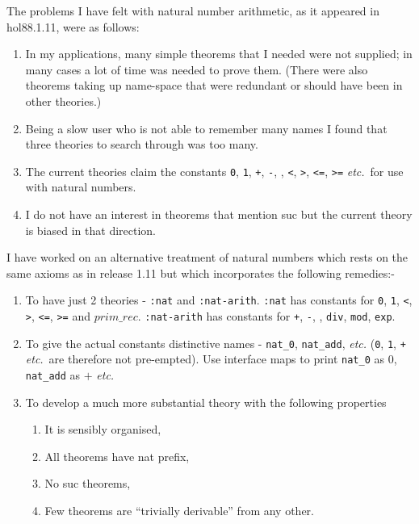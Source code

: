 The problems I have felt with natural number arithmetic, as it appeared
in {\sc hol88.1.11}, were as follows:
\begin{enumerate}
\item In my applications, many simple theorems that I needed were not supplied;
   in many cases a lot of time was needed to prove them.
   (There were also theorems taking up name-space that were redundant or
   should have been in other theories.)
\item Being a slow user who is not able to remember many names I found that
   three theories to search through was too many.
\item The current theories claim the constants
  {\tt 0}, {\tt 1}, {\tt +}, {\tt -}, {\tt *}, {\tt <}, {\tt >},
  {\tt <=}, {\tt >=} {\it etc.}~for use with natural numbers.
\item I do not have an interest in theorems that mention {\sc suc} but
   the current theory is biased in that direction.
\end{enumerate}

I have worked on an alternative treatment of natural numbers which rests
on the same axioms as in release 1.11 but which incorporates the following
remedies:-
\begin{enumerate}
\item To have just 2 theories -  {\tt :nat} and  {\tt :nat-arith}.
   {\tt :nat}  has constants for {\tt 0}, {\tt 1}, {\tt <}, {\tt >},
  {\tt <=}, {\tt >=} and $ prim\_rec $.
   {\tt :nat-arith}  has constants for {\tt +}, {\tt -}, {\tt *},
   {\tt div}, {\tt mod}, {\tt exp}.
\item To give the actual constants distinctive names - {\tt nat\_0},
 {\tt nat\_add}, {\it etc.}  ({\tt 0}, {\tt 1}, {\tt +} {\it etc.}~are
 therefore not pre-empted).
   Use interface maps to print {\tt nat\_0} as $0$, {\tt nat\_add} as
   $+$ {\it etc.}
\item To develop a much more substantial theory with the following properties
\begin{enumerate}
\item It is sensibly organised,
\item All theorems have {\sc nat} prefix,
\item No {\sc suc} theorems,
\item  Few theorems are ``trivially derivable'' from any other.
\end{enumerate}
\end{enumerate}

